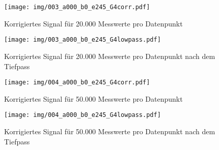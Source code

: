 \begin{figure}[!htbp]
 	\centering
 	\texttt{[image: img/003\_a000\_b0\_e245\_G4corr.pdf]}
 	\caption{Korrigiertes Signal für 20.000 Messwerte pro Datenpunkt}
 	\label{abb:film}
\end{figure}

\begin{figure}[!htbp]
 	\centering
 	\texttt{[image: img/003\_a000\_b0\_e245\_G4lowpass.pdf]}
 	\caption{Korrigiertes Signal für 20.000 Messwerte pro Datenpunkt nach dem Tiefpass}
 	\label{abb:film}
\end{figure}

\begin{figure}[!htbp]
 	\centering
 	\texttt{[image: img/004\_a000\_b0\_e245\_G4corr.pdf]}
 	\caption{Korrigiertes Signal für 50.000 Messwerte pro Datenpunkt}
 	\label{abb:film}
\end{figure}

\begin{figure}[!htbp]
 	\centering
 	\texttt{[image: img/004\_a000\_b0\_e245\_G4lowpass.pdf]}
 	\caption{Korrigiertes Signal für 50.000 Messwerte pro Datenpunkt nach dem Tiefpass}
 	\label{abb:film}
\end{figure}

\newpage